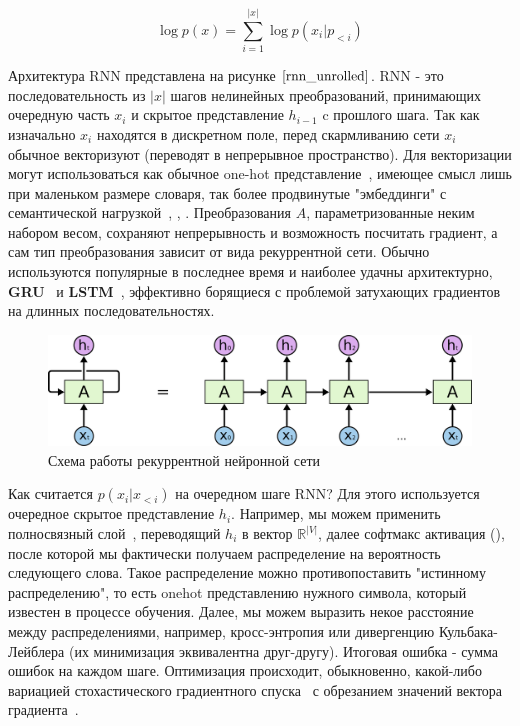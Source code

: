 \documentclass{spbau-diploma}
\begin{document}
\begin{equation}
\label{log_rnn_density}
\log p(x) = \sum\limits^{|x|}_{i=1}{\log p(x_i | p_{<i})}
\end{equation}

Архитектура RNN представлена на рисунке $\ref{rnn_unrolled}$. RNN - это 
последовательность из $|x|$ шагов нелинейных преобразований, принимающих 
очередную часть $x_i$ и скрытое представление $h_{i-1}$ c прошлого шага. Так как
изначально $x_i$ находятся в дискретном поле, перед скармливанию сети $x_i$ 
обычное векторизуют (переводят в непрерывное пространство). Для векторизации 
могут использоваться как обычное one-hot представление~\cite{onehot}, имеющее
смысл лишь при маленьком размере словаря, так более продвинутые "эмбеддинги" с 
семантической нагрузкой~\cite{word2vec}, \cite{glove}, \cite{elmo}. 
Преобразования $A$, параметризованные неким набором весом, сохраняют 
непрерывность и возможность посчитать градиент, а сам тип преобразования 
зависит от вида рекуррентной сети. Обычно используются популярные в последнее 
время и наиболее удачны архитектурно, \textbf{GRU}~\cite{1412.3555} и 
\textbf{LSTM}~\cite{lstm}, эффективно борящиеся с проблемой затухающих 
градиентов на длинных последовательностях.

\begin{figure}[h]
\centering
\includegraphics[width=\textwidth]{images/rnn_unrolled.png}
\caption{Схема работы рекуррентной нейронной сети}
\label{rnn_unrolled}
\end{figure}

Как считается $p(x_i|x_{<i})$ на очередном шаге RNN? Для этого используется 
очередное скрытое представление $h_i$. Например, мы можем применить полносвязный
слой~\cite{cnn}, переводящий $h_i$ в вектор $\mathbb{R}^{|V|}$, далее софтмакс
активация (\cite{wiki:softmax}), после которой мы фактически получаем 
распределение на вероятность следующего слова. Такое распределение можно 
противопоставить "истинному распределению", то есть onehot представлению нужного
символа, который известен в процессе обучения. Далее, мы можем выразить некое 
расстояние между распределениями, например, кросс-энтропия или дивергенцию 
Кульбака-Лейблера (их минимизация эквивалентна друг-другу). Итоговая ошибка - 
сумма ошибок на каждом шаге. Оптимизация происходит, обыкновенно, какой-либо 
вариацией стохастического градиентного спуска~\cite{optimizers} с обрезанием 
значений вектора градиента~\cite{gradient_clipping}.
\end{document}
